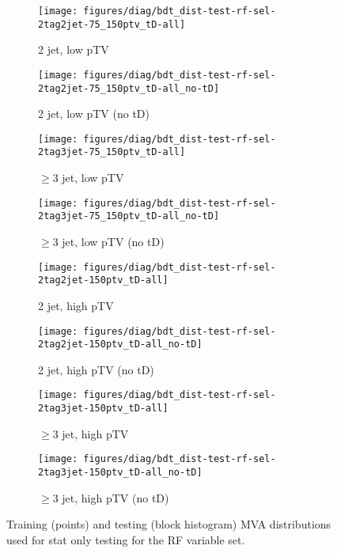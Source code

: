 {\begin{figure}[!htbp]\captionsetup{justification=centering}
  \centering
  \begin{subfigure}[t]{0.49\textwidth}\centering\texttt{[image: figures/diag/bdt\_dist-test-rf-sel-2tag2jet-75\_150ptv\_tD-all]}\caption{2 jet, low pTV}\end{subfigure}
  \begin{subfigure}[t]{0.49\textwidth}\centering\texttt{[image: figures/diag/bdt\_dist-test-rf-sel-2tag2jet-75\_150ptv\_tD-all\_no-tD]}\caption{2 jet, low pTV (no tD)}\end{subfigure}
  \begin{subfigure}[t]{0.49\textwidth}\centering\texttt{[image: figures/diag/bdt\_dist-test-rf-sel-2tag3jet-75\_150ptv\_tD-all]}\caption{$\ge3$ jet, low pTV}\end{subfigure}
  \begin{subfigure}[t]{0.49\textwidth}\centering\texttt{[image: figures/diag/bdt\_dist-test-rf-sel-2tag3jet-75\_150ptv\_tD-all\_no-tD]}\caption{$\ge3$ jet, low pTV (no tD)}\end{subfigure}
  \begin{subfigure}[t]{0.49\textwidth}\centering\texttt{[image: figures/diag/bdt\_dist-test-rf-sel-2tag2jet-150ptv\_tD-all]}\caption{2 jet, high pTV}\end{subfigure}
  \begin{subfigure}[t]{0.49\textwidth}\centering\texttt{[image: figures/diag/bdt\_dist-test-rf-sel-2tag2jet-150ptv\_tD-all\_no-tD]}\caption{2 jet, high pTV (no tD)}\end{subfigure}
  \begin{subfigure}[t]{0.49\textwidth}\centering\texttt{[image: figures/diag/bdt\_dist-test-rf-sel-2tag3jet-150ptv\_tD-all]}\caption{$\ge3$ jet, high pTV}\end{subfigure}
  \begin{subfigure}[t]{0.49\textwidth}\centering\texttt{[image: figures/diag/bdt\_dist-test-rf-sel-2tag3jet-150ptv\_tD-all\_no-tD]}\caption{$\ge3$ jet, high pTV (no tD)}\end{subfigure}
  \caption{Training (points) and testing (block histogram) MVA distributions used for stat only testing for the RF variable set.}
  \label{fig:rf-sel-testing}
\end{figure}

}
